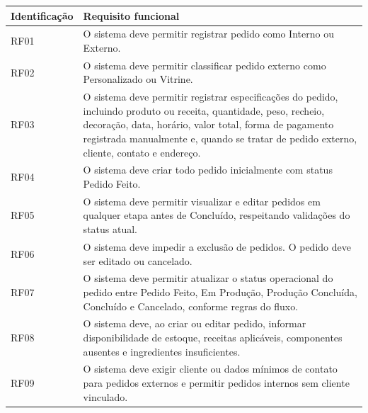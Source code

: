 \begin{quadro}
    \centering
    \label{quadro:rf_pedidos}

    \begin{tabular}{|p{3cm}|p{11cm}|}
        \hline
        \textbf{Identificação} & \textbf{Requisito funcional} \\ \hline

        RF01 &O sistema deve permitir registrar pedido como Interno ou Externo. \\ \hline

        RF02 &  O sistema deve permitir classificar pedido externo como Personalizado ou Vitrine. \\ \hline

        RF03 & O sistema deve permitir registrar especificações do pedido, incluindo produto ou receita, quantidade, peso, recheio, decoração, data, horário, valor total, forma de pagamento registrada manualmente e, quando se tratar de pedido externo, cliente, contato e endereço. \\ \hline

        RF04 & O sistema deve criar todo pedido inicialmente com status Pedido Feito. \\ \hline

        RF05 & O sistema deve permitir visualizar e editar pedidos em qualquer etapa antes de Concluído, respeitando validações do status atual. \\ \hline

        RF06 & O sistema deve impedir a exclusão de pedidos. O pedido deve ser editado ou cancelado. \\ \hline

        RF07 & O sistema deve permitir atualizar o status operacional do pedido entre Pedido Feito, Em Produção, Produção Concluída, Concluído e Cancelado, conforme regras do fluxo. \\ \hline

        RF08 & O sistema deve, ao criar ou editar pedido, informar disponibilidade de estoque, receitas aplicáveis, componentes ausentes e ingredientes insuficientes. \\ \hline

        RF09 & O sistema deve exigir cliente ou dados mínimos de contato para pedidos externos e permitir pedidos internos sem cliente vinculado. \\ \hline
    \end{tabular}

    \vspace{0.2cm}
\end{quadro}

